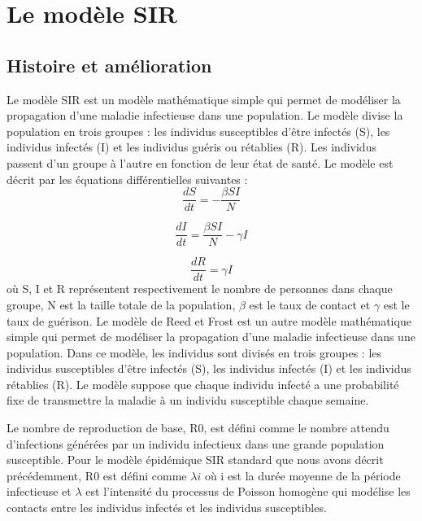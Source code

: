 \section{Le modèle SIR}
        \subsection{Histoire et amélioration}

Le modèle SIR est un modèle mathématique simple qui permet de modéliser la propagation d'une maladie infectieuse dans une population. Le modèle divise la population en trois groupes : les individus susceptibles d'être infectés (S), les individus infectés (I) et les individus guéris ou rétablies (R). Les individus passent d'un groupe à l'autre en fonction de leur état de santé. Le modèle est décrit par les équations différentielles suivantes :
$$\frac{dS}{dt} = -\frac{\beta SI}{N}$$

$$\frac{dI}{dt} = \frac{\beta SI}{N} - \gamma I$$

$$\frac{dR}{dt} = \gamma I$$
où S, I et R représentent respectivement le nombre de personnes dans chaque groupe, N est la taille totale de la population, $\beta$ est le taux de contact et $\gamma$ est le taux de guérison. Le modèle de Reed et Frost est un autre modèle mathématique simple qui permet de modéliser la propagation d'une maladie infectieuse dans une population. Dans ce modèle, les individus sont divisés en trois groupes : les individus susceptibles d'être infectés (S), les individus infectés (I) et les individus rétablies (R). Le modèle suppose que chaque individu infecté a une probabilité fixe de transmettre la maladie à un individu susceptible chaque semaine.

Le nombre de reproduction de base, R0, est défini comme le nombre attendu d'infections générées par un individu infectieux dans une grande population susceptible. Pour le modèle épidémique SIR standard que nous avons décrit précédemment, R0 est défini comme $\lambda i$ où i est la durée moyenne de la période infectieuse et $\lambda$ est l'intensité du processus de Poisson homogène qui modélise les contacts entre les individus infectés et les individus susceptibles.

